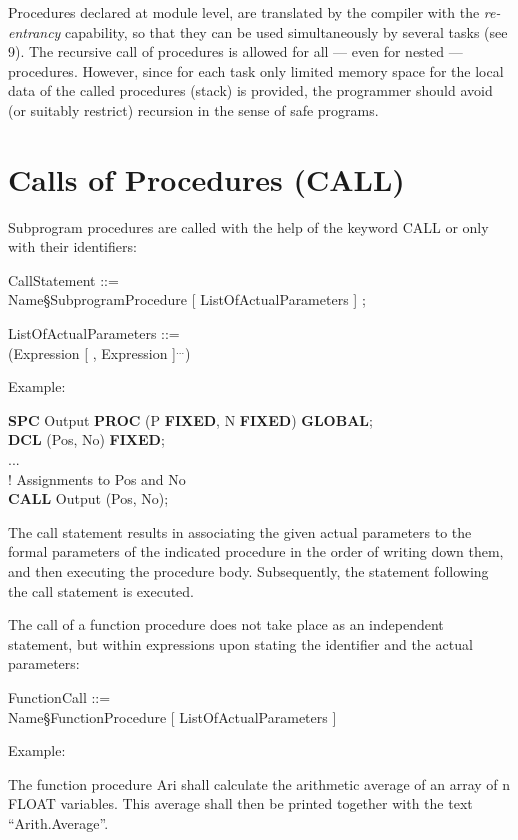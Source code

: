 Procedures declared at module level, are translated by the compiler with
the {\em re-entrancy} capability, so that they can be used
simultaneously by several tasks (see 9). The recursive call of
procedures is allowed for all --- even for nested --- procedures.
However, since for each task only limited memory space for the local
data of the called procedures (stack) is provided, the programmer
should avoid (or suitably restrict) recursion in the sense of safe
programs.

\section{Calls of Procedures (CALL)}   %

Subprogram procedures are called with the help of the keyword CALL or
only with their identifiers:

CallStatement ::=\\
\x [ {\bf CALL} ] Name\S SubprogramProcedure [ ListOfActualParameters ] ;

ListOfActualParameters ::=\\
\x (Expression [ , Expression ]$^{...}$)

Example:

{\bf SPC} Output {\bf PROC} (P {\bf FIXED}, N {\bf FIXED}) {\bf GLOBAL};\\
{\bf DCL} (Pos, No) {\bf FIXED};\\
...\\
! Assignments to Pos and No\\
{\bf CALL} Output (Pos, No);

The call statement results in associating the given actual parameters
to the formal parameters of the indicated procedure in the order of
writing down them, and then executing the procedure body. Subsequently,
the statement following the call statement is executed.

The call of a function procedure does not take place as an independent
statement, but within expressions upon stating the identifier and the
actual parameters:

FunctionCall ::= \\
\x Name\S FunctionProcedure [ ListOfActualParameters ]

Example:

The function procedure Ari shall calculate the arithmetic average of an
array of n FLOAT variables. This average shall then be printed together
with the text ``Arith.Average''.

